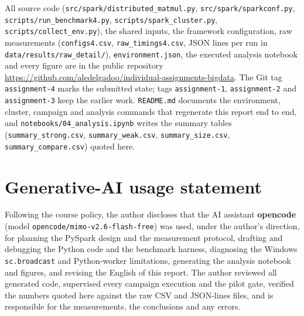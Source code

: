\documentclass[11pt,a4paper]{article}
\begin{document}
{\sloppy
All source code (\texttt{src/spark/distributed\_matmul.py},
\texttt{src/spark/sparkconf.py}, \texttt{scripts/run\_benchmark4.py},
\texttt{scripts/spark\_cluster.py}, \texttt{scripts/collect\_env.py}),
the shared inputs, the framework configuration, raw measurements
(\texttt{configs4.csv}, \texttt{raw\_timings4.csv}, JSON lines per run
in \texttt{data/results/raw\_detail/}), \texttt{environment.json}, the
executed analysis notebook and every figure are in the public repository
\url{https://github.com/aledelgadoo/individual-assignments-bigdata}.
The Git tag \texttt{assignment-4} marks the submitted state; tags
\texttt{assignment-1}, \texttt{assignment-2} and \texttt{assignment-3}
keep the earlier work. \texttt{README.md} documents the environment,
cluster, campaign and analysis commands that regenerate this report end
to end, and \texttt{notebooks/04\_analysis.ipynb} writes the summary
tables (\texttt{summary\_strong.csv}, \texttt{summary\_weak.csv},
\texttt{summary\_size.csv}, \texttt{summary\_compare.csv}) quoted here.\par}

\section*{Generative-AI usage statement}

Following the course policy, the author discloses that the AI assistant
\textbf{opencode} (model \texttt{opencode/mimo-v2.6-flash-free}) was
used, under the author's direction, for planning the PySpark design and
the measurement protocol, drafting and debugging the Python code and
the benchmark harness, diagnosing the Windows \texttt{sc.broadcast} and
Python-worker limitations, generating the analysis notebook and figures,
and revising the English of this report. The author reviewed all
generated code, supervised every campaign execution and the pilot gate,
verified the numbers quoted here against the raw CSV and JSON-lines
files, and is responsible for the measurements, the conclusions and any
errors.
\end{document}
